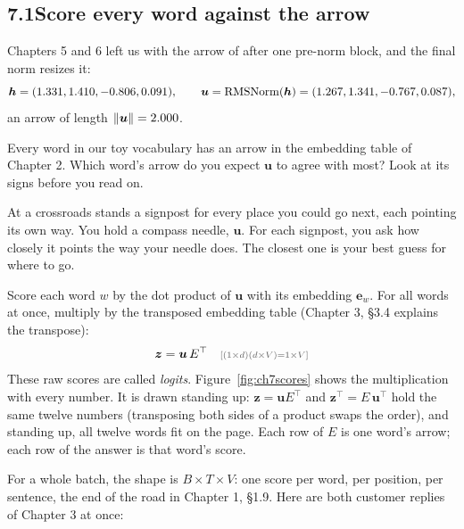 \subsection*{7.1\quad Score every word against the arrow}

Chapters 5 and 6 left us with the arrow of  after one pre-norm block, and the final norm resizes it:
\[
\bm{h}=(1.331, 1.410, -0.806, 0.091), \qquad \bm{u}=\operatorname{RMSNorm}(\bm{h})=(1.267, 1.341, -0.767, 0.087),
\]
an arrow of length $\lVert\bm{u}\rVert=2.000$.

\Predict Every word in our toy vocabulary has an arrow in the embedding table of Chapter 2. Which word's arrow do
you expect $\bm{u}$ to agree with most? Look at its signs before you read on.

\Picture At a crossroads stands a signpost for every place you could go next, each pointing its own way. You
hold a compass needle, $\bm{u}$. For each signpost, you ask how closely it points the way your needle does. The
closest one is your best guess for where to go.

\Exactly Score each word $w$ by the dot product of $\bm{u}$ with its embedding $\bm{e}_w$. For all words at
once, multiply by the transposed embedding table (Chapter 3, \S3.4 explains the transpose):
\[
\bm{z} = \bm{u}\,E^\top \shape{(1\times d)(d\times V) = 1\times V}
\]
These raw scores are called \emph{logits}. Figure~\ref{fig:ch7scores} shows the multiplication with every number.
It is drawn standing up: $\bm{z}=\bm{u}E^\top$ and $\bm{z}^\top=E\,\bm{u}^\top$ hold the same twelve numbers
(transposing both sides of a product swaps the order), and standing up, all twelve words fit on the page. Each
row of $E$ is one word's arrow; each row of the answer is that word's score.

\par\medskip\noindent\begin{minipage}{\linewidth}\centering

\label{fig:ch7scores}
\end{minipage}\par\medskip

For a whole batch, the shape is $B\times T\times V$: one score per word, per position, per sentence, the end of
the road in Chapter 1, \S1.9. Here are both customer replies of Chapter 3 at once:

